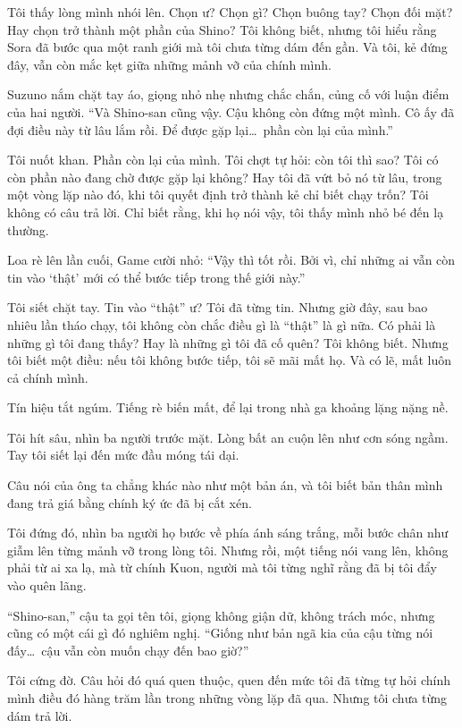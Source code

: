 \documentclass[../main.tex]{subfiles}
\begin{document}
Tôi thấy lòng mình nhói lên. Chọn ư? Chọn gì? Chọn buông tay? Chọn đối mặt? Hay chọn trở thành một phần của Shino? Tôi không biết, nhưng tôi hiểu rằng Sora đã bước qua một ranh giới mà tôi chưa từng dám đến gần. Và tôi, kẻ đứng đây, vẫn còn mắc kẹt giữa những mảnh vỡ của chính mình.

Suzuno nắm chặt tay áo, giọng nhỏ nhẹ nhưng chắc chắn, củng cố với luận điểm của hai người. ``Và Shino-san cũng vậy. Cậu không còn đứng một mình. Cô ấy đã đợi điều này từ lâu lắm rồi. Để được gặp lại\dots\ phần còn lại của mình.''

Tôi nuốt khan. Phần còn lại của mình. Tôi chợt tự hỏi: còn tôi thì sao? Tôi có còn phần nào đang chờ được gặp lại không? Hay tôi đã vứt bỏ nó từ lâu, trong một vòng lặp nào đó, khi tôi quyết định trở thành kẻ chỉ biết chạy trốn? Tôi không có câu trả lời. Chỉ biết rằng, khi họ nói vậy, tôi thấy mình nhỏ bé đến lạ thường.

Loa rè lên lần cuối, Game cười nhỏ: ``Vậy thì tốt rồi. Bởi vì, chỉ những ai vẫn còn tin vào `thật' mới có thể bước tiếp trong thế giới này.''

Tôi siết chặt tay. Tin vào ``thật'' ư? Tôi đã từng tin. Nhưng giờ đây, sau bao nhiêu lần tháo chạy, tôi không còn chắc điều gì là ``thật'' là gì nữa. Có phải là những gì tôi đang thấy? Hay là những gì tôi đã cố quên? Tôi không biết. Nhưng tôi biết một điều: nếu tôi không bước tiếp, tôi sẽ mãi mất họ. Và có lẽ, mất luôn cả chính mình.

Tín hiệu tắt ngúm. Tiếng rè biến mất, để lại trong nhà ga khoảng lặng nặng nề.

Tôi hít sâu, nhìn ba người trước mặt. Lòng bất an cuộn lên như cơn sóng ngầm. Tay tôi siết lại đến mức đầu móng tái dại.

Câu nói của ông ta chẳng khác nào như một bản án, và tôi biết bản thân mình đang trả giá bằng chính ký ức đã bị cắt xén.

Tôi đứng đó, nhìn ba người họ bước về phía ánh sáng trắng, mỗi bước chân như giẫm lên từng mảnh vỡ trong lòng tôi. Nhưng rồi, một tiếng nói vang lên, không phải từ ai xa lạ, mà từ chính Kuon, người mà tôi từng nghĩ rằng đã bị tôi đẩy vào quên lãng.

``Shino-san,'' cậu ta gọi tên tôi, giọng không giận dữ, không trách móc, nhưng cũng có một cái gì đó nghiêm nghị. ``Giống như bản ngã kia của cậu từng nói đấy\dots\ cậu vẫn còn muốn chạy đến bao giờ?''

Tôi cứng đờ. Câu hỏi đó quá quen thuộc, quen đến mức tôi đã từng tự hỏi chính mình điều đó hàng trăm lần trong những vòng lặp đã qua. Nhưng tôi chưa từng dám trả lời.
\end{document}

